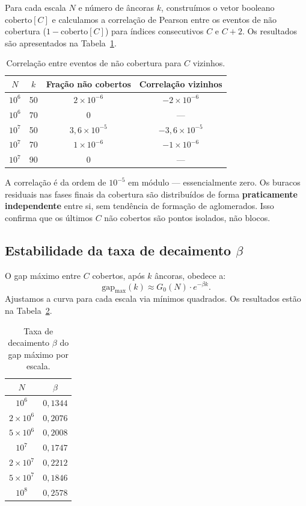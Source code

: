 \documentclass[11pt]{article}
\theoremstyle{definition}
\begin{document}
	Para cada escala $N$ e número de âncoras $k$, construímos o vetor booleano $\mathrm{coberto}[C]$ e calculamos a correlação de Pearson entre os eventos de não cobertura ($1-\mathrm{coberto}[C]$) para índices consecutivos $C$ e $C+2$. Os resultados são apresentados na Tabela~\ref{tab:corr_vizinhos}.
	
	\begin{table}[h]
		\centering
		\caption{Correlação entre eventos de não cobertura para $C$ vizinhos.}
		\label{tab:corr_vizinhos}
		\begin{tabular}{cccc}
			\toprule
			$N$ & $k$ & Fração não cobertos & Correlação vizinhos \\
			\midrule
			$10^6$ & 50 & $2\times10^{-6}$   & $-2\times10^{-6}$ \\
			$10^6$ & 70 & $0$                 & — \\
			$10^7$ & 50 & $3{,}6\times10^{-5}$ & $-3{,}6\times10^{-5}$ \\
			$10^7$ & 70 & $1\times10^{-6}$   & $-1\times10^{-6}$ \\
			$10^7$ & 90 & $0$                 & — \\
			\bottomrule
		\end{tabular}
	\end{table}
	
	A correlação é da ordem de $10^{-5}$ em módulo — essencialmente zero. Os buracos residuais nas fases finais da cobertura são distribuídos de forma \textbf{praticamente independente} entre si, sem tendência de formação de aglomerados. Isso confirma que os últimos $C$ não cobertos são pontos isolados, não blocos.
	
	\subsection{Estabilidade da taxa de decaimento $\beta$}
	
	O gap máximo entre $C$ cobertos, após $k$ âncoras, obedece a:
	\[
	\mathrm{gap}_{\max}(k) \approx G_0(N)\cdot e^{-\beta k}.
	\]
	Ajustamos a curva para cada escala via mínimos quadrados. Os resultados estão na Tabela~\ref{tab:beta}.
	
	\begin{table}[h]
		\centering
		\caption{Taxa de decaimento $\beta$ do gap máximo por escala.}
		\label{tab:beta}
		\begin{tabular}{cc}
			\toprule
			$N$ & $\beta$ \\
			\midrule
			$10^6$   & $0{,}1344$ \\
			$2\times10^6$ & $0{,}2076$ \\
			$5\times10^6$ & $0{,}2008$ \\
			$10^7$   & $0{,}1747$ \\
			$2\times10^7$ & $0{,}2212$ \\
			$5\times10^7$ & $0{,}1846$ \\
			$10^8$   & $0{,}2578$ \\
			\bottomrule
		\end{tabular}
	\end{table}
	
\end{document}
